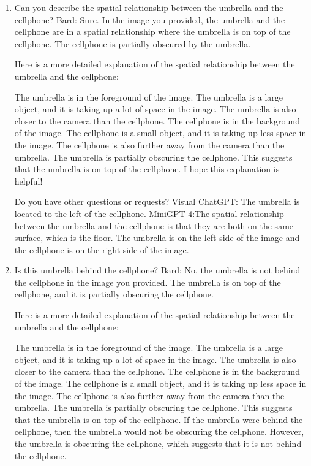 \begin{enumerate}
    \item Can you describe the spatial relationship between the umbrella and the cellphone?
    \subitem Bard: 
    Sure. In the image you provided, the umbrella and the cellphone are in a spatial relationship where the umbrella is on top of the cellphone. The cellphone is partially obscured by the umbrella.
    
    Here is a more detailed explanation of the spatial relationship between the umbrella and the cellphone:
    
    The umbrella is in the foreground of the image. The umbrella is a large object, and it is taking up a lot of space in the image. The umbrella is also closer to the camera than the cellphone.
    The cellphone is in the background of the image. The cellphone is a small object, and it is taking up less space in the image. The cellphone is also further away from the camera than the umbrella.
    The umbrella is partially obscuring the cellphone. This suggests that the umbrella is on top of the cellphone.
    I hope this explanation is helpful!
    
    Do you have other questions or requests?
    \subitem Visual ChatGPT: The umbrella is located to the left of the cellphone.
    \subitem MiniGPT-4:The spatial relationship between the umbrella and the cellphone is that they are both on the same surface, which is the floor. The umbrella is on the left side of the image and the cellphone is on the right side of the image. 
    \item Is this umbrella behind the cellphone?
    \subitem Bard: 
    No, the umbrella is not behind the cellphone in the image you provided. The umbrella is on top of the cellphone, and it is partially obscuring the cellphone.
    
    Here is a more detailed explanation of the spatial relationship between the umbrella and the cellphone:
    
    The umbrella is in the foreground of the image. The umbrella is a large object, and it is taking up a lot of space in the image. The umbrella is also closer to the camera than the cellphone.
    The cellphone is in the background of the image. The cellphone is a small object, and it is taking up less space in the image. The cellphone is also further away from the camera than the umbrella.
    The umbrella is partially obscuring the cellphone. This suggests that the umbrella is on top of the cellphone.
    If the umbrella were behind the cellphone, then the umbrella would not be obscuring the cellphone. However, the umbrella is obscuring the cellphone, which suggests that it is not behind the cellphone.
    

\end{enumerate}
